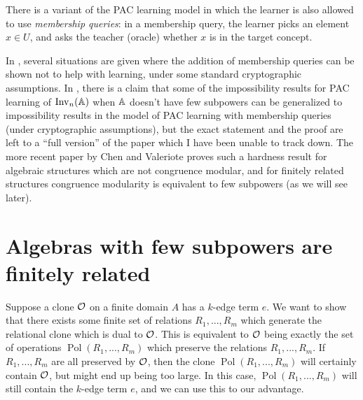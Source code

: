 \documentclass[letterpaper,11pt]{article}
\DeclareMathOperator{\Pol}{Pol}
\DeclareMathOperator{\Inv}{Inv}
\begin{document}
\begin{rem} There is a variant of the PAC learning model in which the learner is also allowed to use \emph{membership queries}: in a membership query, the learner picks an element $x \in U$, and asks the teacher (oracle) whether $x$ is in the target concept.

In \cite{pac-membership}, several situations are given where the addition of membership queries can be shown not to help with learning, under some standard cryptographic assumptions. In \cite{learnable-gmm}, there is a claim that some of the impossibility results for PAC learning of $\Inv_n(\bA)$ when $\mathbb{A}$ doesn't have few subpowers can be generalized to impossibility results in the model of PAC learning with membership queries (under cryptographic assumptions), but the exact statement and the proof are left to a ``full version'' of the paper which I have been unable to track down. The more recent paper \cite{membership-query-hardness} by Chen and Valeriote proves such a hardness result for algebraic structures which are not congruence modular, and for finitely related structures congruence modularity is equivalent to few subpowers (as we will see later).
\end{rem}



\section{Algebras with few subpowers are finitely related}

Suppose a clone $\mathcal{O}$ on a finite domain $A$ has a $k$-edge term $e$. We want to show that there exists some finite set of relations $R_1, ..., R_m$ which generate the relational clone which is dual to $\mathcal{O}$. This is equivalent to $\mathcal{O}$ being exactly the set of operations $\Pol(R_1, ..., R_m)$ which preserve the relations $R_1, ..., R_m$. If $R_1, ..., R_m$ are all preserved by $\mathcal{O}$, then the clone $\Pol(R_1, ..., R_m)$ will certainly contain $\mathcal{O}$, but might end up being too large. In this case, $\Pol(R_1, ..., R_m)$ will still contain the $k$-edge term $e$, and we can use this to our advantage.
\end{document}
